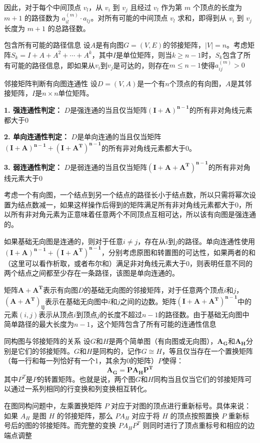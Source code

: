 \documentclass[lang=cn,11pt]{elegantbook}
\begin{document}
因此，对于每个中间顶点 $v_l$，从 $v_i$ 到 $v_j$ 且经过 $v_l$ 作为第 $m$ 个顶点的长度为 $m+1$ 的路径数为 $a_{il}^{(m)} \cdot a_{lj}$。对所有可能的中间顶点 $v_l$ 求和，即得到从 $v_i$ 到 $v_j$ 长度为 $m+1$ 的总路径数。
\begin{theorem}{包含所有可能的路径信息}
    设$A$是有向图$G=(V,E)$的邻接矩阵，$|V|=n$。考虑矩阵$S_k = I + A + A^2 + \cdots + A^k$，其中$I$是单位矩阵，则当$k \geqslant n-1$时，$S_k$包含了所有可能的路径信息，即如果从$v_i$到$v_j$是可达的，则存在$m \leqslant n-1$使得$a_{ij}^{(m)} > 0$
\end{theorem}
\begin{theorem}{邻接矩阵判断有向图连通性}
设$D=(V,A)$是一个有$n$个顶点的有向图，$A$是其邻接矩阵，$I$是$n\times n$单位矩阵。

\textbf{1. 强连通性判定：}
$D$是强连通的当且仅当矩阵$\bm{(I+A)^{n-1}}$的所有非对角线元素都大于0

\textbf{2. 单向连通性判定：}
$D$是单向连通的当且仅当矩阵$\bm{(I+A)^{n-1} + (I+A^T)^{n-1}}$的所有非对角线元素都大于0。


\textbf{3. 弱连通性判定：}
$D$是弱连通的当且仅当矩阵$\bm{(I+A+A^T)^{n-1}}$的所有非对角线元素大于0
\end{theorem}
考虑一个有向图，一个结点到另一个结点的路径长小于结点数，所以只需将幂次设置为结点数减一，如果这样操作后得到的矩阵满足所有非对角线元素都大于0，所以所有非对角元素为正意味着任意两个不同顶点互相可达，所以该有向图是强连通的。

如果基础无向图是连通的，则对于任意$i \neq j$，存在从$i$到$j$的路径。单向连通性使用$\bm{(I+A)^{n-1} + (I+A^T)^{n-1}}$，分别考虑原图和转置图的可达性，如果两者的和（这里可以看作析取，或者布尔和）满足非对角线元素大于0，则表明任意不同的两个结点之间都至少存在一条路径，该图是单向连通的。

矩阵$\bm{A+A^T}$表示有向图$D$的基础无向图的邻接矩阵，对于任意两个顶点$i$和$j$，$\bm{(A+A^T)_{ij}}$表示在基础无向图中$i$和$j$之间的边数。矩阵$\bm{(I+A+A^T)^{n-1}}$中的元素$(i,j)$表示从顶点$i$到顶点$j$的长度不超过$n-1$的路径数。由于基础无向图中简单路径的最大长度为$n-1$，这个矩阵包含了所有可能的连通性信息
\begin{theorem}{同构图与邻接矩阵的关系}
设$G$和$H$是两个简单图（有向图或无向图），$\bm{A_G}$和$\bm{A_H}$分别是它们的邻接矩阵。$G$和$H$是同构的，记作$G \cong H$，等且仅当存在一个置换矩阵（每一行和每一列恰好有一个1，其余为0的矩阵）$P$使得：
\[
\bm{A_G = P A_H P^T}
\]
其中$P^T$是$P$的转置矩阵。也就是说，两个图$G$和$H$同构当且仅当它们的邻接矩阵可以通过一系列相同的行变换和列变换相互转化。
\end{theorem}
在图同构问题中，左乘置换矩阵 $P$ 对应于对图的顶点进行重新标号。具体来说：如果 $A_H$ 是图 $H$ 的邻接矩阵，那么 $PA_H$ 对应于将 $H$ 的顶点按照置换 $P$ 重新标号后的图的邻接矩阵。而完整的变换 $PA_HP^T$ 则同时进行了顶点重标号和相应的边端点调整
\end{document}

